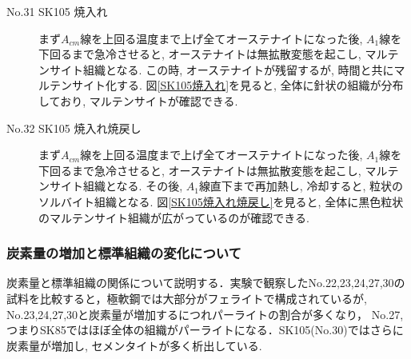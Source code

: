 \documentclass[a4paper,11pt,uplatex]{jsarticle}
\begin{document}
\begin{description}
  \item[No.31 SK105 焼入れ]
  まず$A_{cm}$線を上回る温度まで上げ全てオーステナイトになった後, $A_1$線を下回るまで急冷させると, オーステナイトは無拡散変態を起こし, マルテンサイト組織となる.
  この時, オーステナイトが残留するが, 時間と共にマルテンサイト化する. 図\ref{SK105焼入れ}を見ると, 全体に針状の組織が分布しており, マルテンサイトが確認できる.
  \item[No.32 SK105 焼入れ焼戻し]
  まず$A_{cm}$線を上回る温度まで上げ全てオーステナイトになった後, $A_1$線を下回るまで急冷させると, オーステナイトは無拡散変態を起こし, マルテンサイト組織となる.
  その後, $A_1$線直下まで再加熱し, 冷却すると, 粒状のソルバイト組織となる. 図\ref{SK105焼入れ焼戻し}を見ると, 全体に黒色粒状のマルテンサイト組織が広がっているのが確認できる.
\end{description}
\subsubsection{炭素量の増加と標準組織の変化について}
炭素量と標準組織の関係について説明する．実験で観察したNo.22,23,24,27,30の試料を比較すると，極軟鋼では大部分がフェライトで構成されているが, No.23,24,27,30と炭素量が増加するにつれパーライトの割合が多くなり，
No.27, つまりSK85ではほぼ全体の組織がパーライトになる．SK105(No.30)ではさらに炭素量が増加し, セメンタイトが多く析出している.
\end{document}
